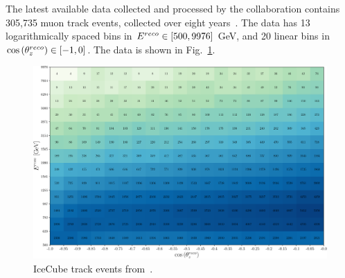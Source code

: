 The latest available data collected and processed by the collaboration contains 305,735 muon track events, collected over eight years~\cite{IC2020}. 
The data has 13 logarithmically spaced bins in $E^{reco} \in [500,9976]$ \si{\GeV}, and 20 linear bins in $\cos{(\theta_z^{reco})} \in [-1,0]$. The data is shown in Fig.~\ref{fig:IC_data}.

\begin{figure}[ht]
    \centering
    \includegraphics[scale=0.4]{figures/IC_data.pdf}
    \caption{IceCube track events from~\cite{IC2020}.}\label{fig:IC_data}
\end{figure}

